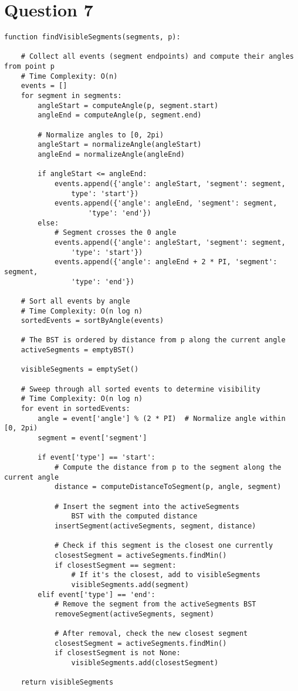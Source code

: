 \documentclass{article}
\begin{document}
\section*{Question 7}

\begin{verbatim}
function findVisibleSegments(segments, p):

    # Collect all events (segment endpoints) and compute their angles from point p
    # Time Complexity: O(n)
    events = []
    for segment in segments:
        angleStart = computeAngle(p, segment.start)
        angleEnd = computeAngle(p, segment.end)

        # Normalize angles to [0, 2pi)
        angleStart = normalizeAngle(angleStart)
        angleEnd = normalizeAngle(angleEnd)

        if angleStart <= angleEnd:
            events.append({'angle': angleStart, 'segment': segment, 
                type': 'start'})
            events.append({'angle': angleEnd, 'segment': segment, 
                    'type': 'end'})
        else:
            # Segment crosses the 0 angle
            events.append({'angle': angleStart, 'segment': segment, 
                'type': 'start'})
            events.append({'angle': angleEnd + 2 * PI, 'segment': segment, 
                'type': 'end'})

    # Sort all events by angle
    # Time Complexity: O(n log n)
    sortedEvents = sortByAngle(events)

    # The BST is ordered by distance from p along the current angle
    activeSegments = emptyBST()

    visibleSegments = emptySet()

    # Sweep through all sorted events to determine visibility
    # Time Complexity: O(n log n)
    for event in sortedEvents:
        angle = event['angle'] % (2 * PI)  # Normalize angle within [0, 2pi)
        segment = event['segment']

        if event['type'] == 'start':
            # Compute the distance from p to the segment along the current angle
            distance = computeDistanceToSegment(p, angle, segment)
            
            # Insert the segment into the activeSegments
                BST with the computed distance
            insertSegment(activeSegments, segment, distance)
            
            # Check if this segment is the closest one currently
            closestSegment = activeSegments.findMin()
            if closestSegment == segment:
                # If it's the closest, add to visibleSegments
                visibleSegments.add(segment)
        elif event['type'] == 'end':
            # Remove the segment from the activeSegments BST
            removeSegment(activeSegments, segment)
            
            # After removal, check the new closest segment
            closestSegment = activeSegments.findMin()
            if closestSegment is not None:
                visibleSegments.add(closestSegment)

    return visibleSegments
\end{verbatim}
\end{document}
